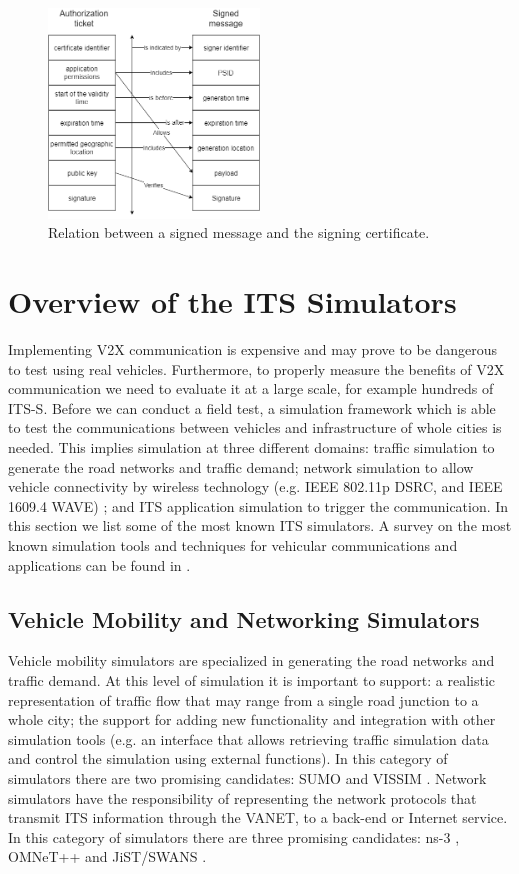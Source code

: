 \begin{figure}
	\centering
	\includegraphics[width=0.5\textwidth]{Figures/relation.png}
	\caption{\label{fig:relation}Relation between a signed message and the signing certificate.}
\end{figure}


\section{Overview of the ITS Simulators}\label{simulators}
Implementing V2X communication is expensive and may prove to be dangerous to test using real vehicles. Furthermore, to properly measure the benefits of V2X communication we need to evaluate it at a large scale, for example hundreds of ITS-S. Before we can conduct a field test, a simulation framework which is able to test the communications between vehicles and infrastructure of whole cities is needed. This implies simulation at three different domains: traffic simulation to generate the road networks and traffic demand; network simulation to allow vehicle connectivity by wireless technology (e.g. IEEE 802.11p
DSRC, and IEEE 1609.4 WAVE) \cite{network_vehicle} \cite{network_vehicle2}; and ITS application simulation to trigger the communication. 
In this section we list some of the most known ITS simulators. A survey on the most known simulation tools and techniques for vehicular communications and applications can be found in \cite{sims}.

\subsection{Vehicle Mobility and Networking Simulators} 
Vehicle mobility simulators are specialized in generating the road networks and traffic demand. At this level of simulation it is important to support: a realistic representation of traffic flow that may range from a single road junction to a whole city; the support for adding new functionality and integration with other simulation tools (e.g. an interface that allows retrieving traffic simulation data and control the simulation using external functions). In this category of simulators there are two promising candidates: SUMO \cite{SUMO} and VISSIM \cite{vissim}. Network simulators have the responsibility of representing the network protocols that transmit ITS information through the VANET, to a back-end or Internet service. In this category of simulators there are three promising candidates: ns-3 \cite{ns3}, OMNeT++ \cite{omnet} and JiST\slash SWANS \cite{jist}.


